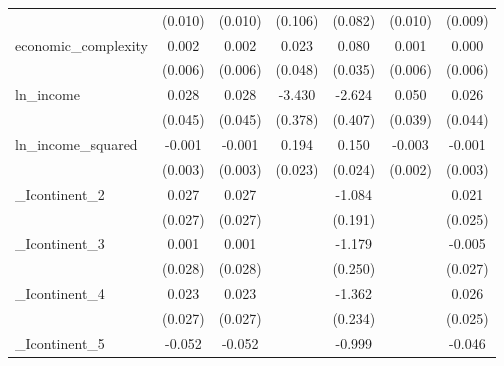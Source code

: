 {\begin{tabular}{l*{6}{c}}
            &     (0.010)         &     (0.010)         &     (0.106)         &     (0.082)         &     (0.010)         &     (0.009)         \\
[1em]
economic\_complexity&       0.002         &       0.002         &       0.023         &       0.080\sym{*}  &       0.001         &       0.000         \\
            &     (0.006)         &     (0.006)         &     (0.048)         &     (0.035)         &     (0.006)         &     (0.006)         \\
[1em]
ln\_income   &       0.028         &       0.028         &      -3.430\sym{***}&      -2.624\sym{***}&       0.050         &       0.026         \\
            &     (0.045)         &     (0.045)         &     (0.378)         &     (0.407)         &     (0.039)         &     (0.044)         \\
[1em]
ln\_income\_squared&      -0.001         &      -0.001         &       0.194\sym{***}&       0.150\sym{***}&      -0.003         &      -0.001         \\
            &     (0.003)         &     (0.003)         &     (0.023)         &     (0.024)         &     (0.002)         &     (0.003)         \\
[1em]
\_Icontinent\_2&       0.027         &       0.027         &                     &      -1.084\sym{***}&                     &       0.021         \\
            &     (0.027)         &     (0.027)         &                     &     (0.191)         &                     &     (0.025)         \\
[1em]
\_Icontinent\_3&       0.001         &       0.001         &                     &      -1.179\sym{***}&                     &      -0.005         \\
            &     (0.028)         &     (0.028)         &                     &     (0.250)         &                     &     (0.027)         \\
[1em]
\_Icontinent\_4&       0.023         &       0.023         &                     &      -1.362\sym{***}&                     &       0.026         \\
            &     (0.027)         &     (0.027)         &                     &     (0.234)         &                     &     (0.025)         \\
[1em]
\_Icontinent\_5&      -0.052         &      -0.052         &                     &      -0.999\sym{***}&                     &      -0.046         \\

\end{tabular}}
